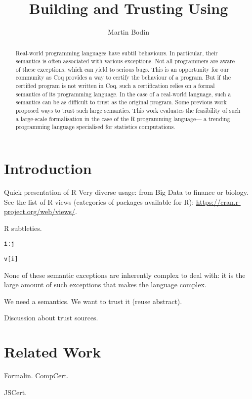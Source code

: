\documentclass[9pt, sigplan, natbib=false]{acmart}
\title{Building and Trusting \R{} Using \Coq{}}
\author{Martin Bodin}
\affiliation{
    \institution{Center of Mathematical Modeling}
    \streetaddress{Beauchef 851}
    \city{Santiago}
    \country{Chile}
}
\newcommand\Coq{Coq}
\newcommand\R{R}
\begin{document}
\begin{abstract}
Real-world programming languages have subtil behaviours.
In particular, their semantics is often associated with
various exceptions.
Not all programmers are aware of these exceptions,
which can yield to serious bugs.
This is an opportunity for our community
as \Coq{} provides a way to certify the behaviour of a program.
But if the certified program is not written in \Coq{},
such a certification relies on a formal semantics of its programming language.
In the case of a real-world language, such a semantics
can be as difficult to trust as the original program.
Some previous work proposed ways to trust such large semantics.
This work evaluates the feasibility of such a large-scale formalisation
in the case of the \R{} programming language—%
a trending programming language specialised for statistics computations.
\end{abstract}

\maketitle

\section{Introduction}

Quick presentation of \R{}
Very diverse usage: from Big Data to finance or biology.
See the list of \R{} views (categories of packages available for \R{}):
\url{https://cran.r-project.org/web/views/}.

\R{} subtleties.

\texttt{i:j}

\begin{verbatim}
v[i]
\end{verbatim}

None of these semantic exceptions are inherently complex to deal with:
it is the large amount of such exceptions that makes the language complex.

We need a semantics.
We want to trust it (reuse abstract).

Discussion about trust sources.

\section{Related Work}

Formalin.
CompCert.

JSCert.
\end{document}
